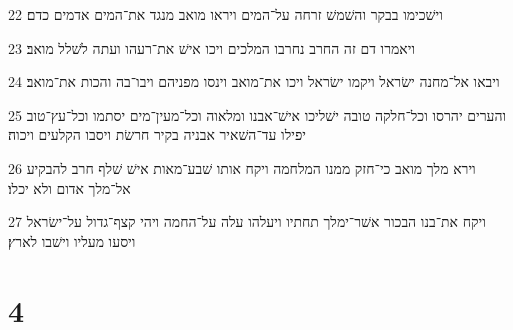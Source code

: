 \par 22 וישׁכימו בבקר והשׁמשׁ זרחה על־המים ויראו מואב מנגד את־המים אדמים כדם׃
\par 23 ויאמרו דם זה החרב נחרבו המלכים ויכו אישׁ את־רעהו ועתה לשׁלל מואב׃
\par 24 ויבאו אל־מחנה ישׂראל ויקמו ישׂראל ויכו את־מואב וינסו מפניהם ויבו־בה והכות את־מואב׃
\par 25 והערים יהרסו וכל־חלקה טובה ישׁליכו אישׁ־אבנו ומלאוה וכל־מעין־מים יסתמו וכל־עץ־טוב יפילו עד־השׁאיר אבניה בקיר חרשׂת ויסבו הקלעים ויכוה׃
\par 26 וירא מלך מואב כי־חזק ממנו המלחמה ויקח אותו שׁבע־מאות אישׁ שׁלף חרב להבקיע אל־מלך אדום ולא יכלו׃
\par 27 ויקח את־בנו הבכור אשׁר־ימלך תחתיו ויעלהו עלה על־החמה ויהי קצף־גדול על־ישׂראל ויסעו מעליו וישׁבו לארץ׃

\chapter{4}

